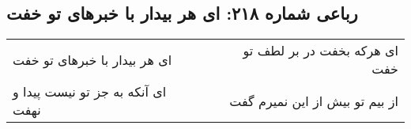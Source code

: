\begin{center}
\section*{رباعی شماره ۲۱۸: ای هر بیدار با خبرهای تو خفت}
\label{sec:0218}
\begin{longtable}{l p{0.5cm} r}
ای هر بیدار با خبرهای تو خفت
&&
ای هرکه بخفت در بر لطف تو خفت
\\
ای آنکه به جز تو نیست پیدا و نهفت
&&
از بیم تو بیش از این نمیرم گفت
\\
\end{longtable}
\end{center}
